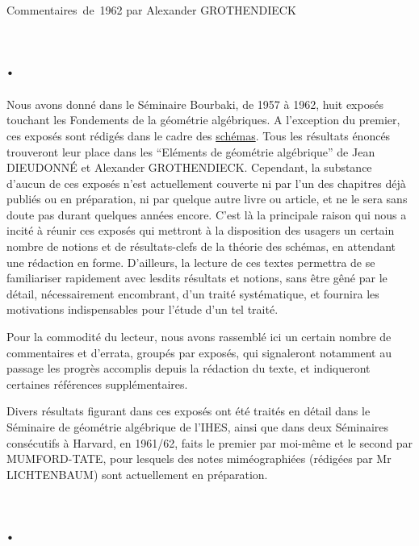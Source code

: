 \unit{Commentaires de 1962}
%
  {par Alexander GROTHENDIECK}

\section*{\normalfont{}.}

Nous avons donné dans le Séminaire Bourbaki, de 1957 à 1962, huit exposés
touchant les Fondements de la géométrie algébriques. A l'exception du premier,
ces exposés sont rédigés dans le cadre des \uline{schémas}. Tous les résultats énoncés
trouveront leur place dans les ``Eléments de géométrie algébrique'' de Jean
DIEUDONNÉ et Alexander GROTHENDIECK. Cependant, la substance d'aucun de ces
exposés n'est actuellement couverte ni par l'un des chapitres déjà publiés ou
en préparation, ni par quelque autre livre ou article, et ne le sera sans doute
pas durant quelques années encore. C'est là la principale raison qui nous a
incité à réunir ces exposés qui mettront à la disposition des usagers un certain
nombre de notions et de résultats-clefs de la théorie des schémas, en attendant
une rédaction en forme. D'ailleurs, la lecture de ces textes permettra de se
familiariser rapidement avec lesdits résultats et notions, sans être gêné par
le détail, nécessairement encombrant, d'un traité systématique, et fournira les
motivations indispensables pour l'étude d'un tel traité.

Pour la commodité du lecteur, nous avons rassemblé ici un certain nombre de
commentaires et d'errata, groupés par exposés, qui signaleront notamment au
passage les progrès accomplis depuis la rédaction du texte, et indiqueront
certaines références supplémentaires.

Divers résultats figurant dans ces exposés ont été traités en détail dans le
Séminaire de géométrie algébrique de l'IHES, ainsi que dans deux Séminaires
consécutifs à Harvard, en 1961/62, faits le premier par moi-même et le second
par MUMFORD-TATE, pour lesquels des notes miméographiées (rédigées par Mr
LICHTENBAUM) sont actuellement en préparation.

\section*{\normalfont{}.}

